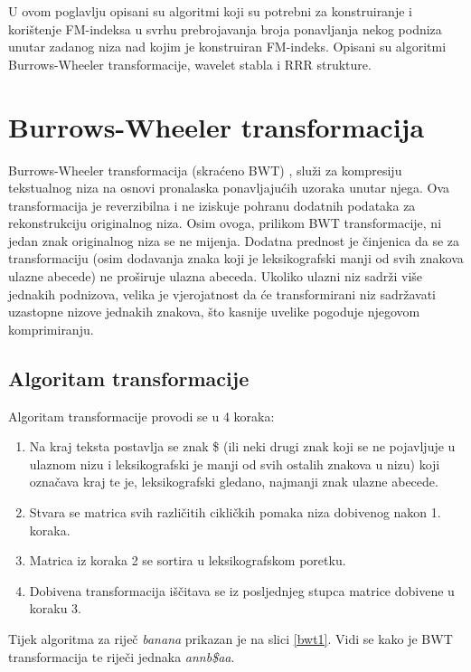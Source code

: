 U ovom poglavlju opisani su algoritmi koji su potrebni za konstruiranje i korištenje FM-indeksa u svrhu prebrojavanja broja ponavljanja nekog podniza unutar zadanog niza nad kojim je konstruiran FM-indeks. Opisani su algoritmi Burrows-Wheeler transformacije, wavelet stabla i RRR strukture.


\section{Burrows-Wheeler transformacija}
Burrows-Wheeler transformacija (skraćeno BWT) \cite{bwt1}, služi za kompresiju tekstualnog niza na osnovi pronalaska ponavljajućih uzoraka unutar njega. Ova transformacija je reverzibilna i ne iziskuje pohranu dodatnih podataka za rekonstrukciju originalnog niza. Osim ovoga, prilikom BWT transformacije, ni jedan znak originalnog niza se ne mijenja. Dodatna prednost je činjenica da se za transformaciju (osim dodavanja znaka koji je leksikografski manji od svih znakova ulazne abecede) ne proširuje ulazna abeceda. Ukoliko ulazni niz sadrži više jednakih podnizova, velika je vjerojatnost da će transformirani niz sadržavati uzastopne nizove jednakih znakova, što kasnije uvelike pogoduje njegovom komprimiranju.

\subsection{Algoritam transformacije}
Algoritam transformacije provodi se u 4 koraka:

\begin{enumerate}
  \item Na kraj teksta postavlja se znak \$ (ili neki drugi znak koji se ne pojavljuje u ulaznom nizu i leksikografski je manji od svih ostalih znakova u nizu) koji označava kraj te je, leksikografski gledano, najmanji znak ulazne abecede.
  \item Stvara se matrica svih različitih cikličkih pomaka niza dobivenog nakon 1. koraka.
  \item Matrica iz koraka 2 se sortira u leksikografskom poretku.
  \item Dobivena transformacija iščitava se iz posljednjeg stupca matrice dobivene u koraku 3.

\end{enumerate}

Tijek algoritma za riječ \emph{banana} prikazan je na slici \ref{bwt1}. Vidi se kako je BWT transformacija te riječi jednaka \emph{annb\$aa}. 


